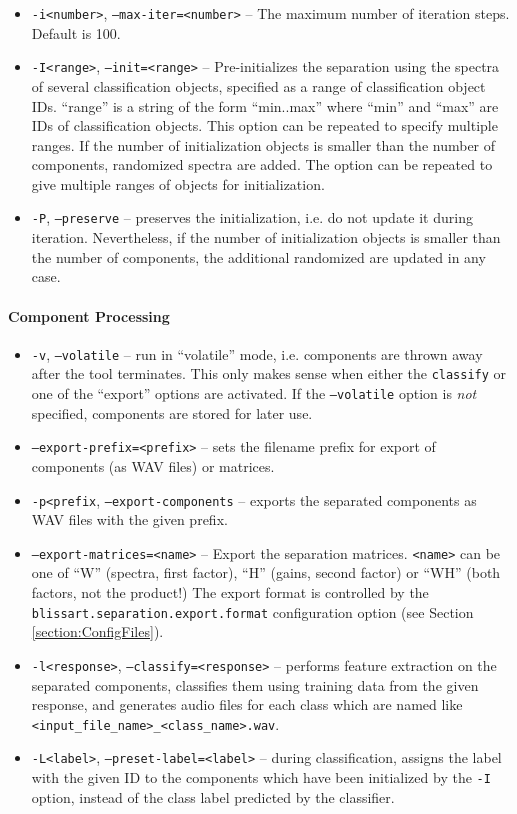 \begin{itemize}
  \item {\tt -i<number>}, {\tt --max-iter=<number>} -- The maximum number of
    iteration steps. Default is 100.
  \item {\tt -I<range>}, {\tt --init=<range>} -- Pre-initializes the
    separation using the spectra of several classification objects,
    specified as a range of classification object IDs. ``range'' is a
    string of the form ``min..max'' where ``min'' and ``max'' are IDs of
    classification objects. This option can be repeated to specify multiple
    ranges. If the number of initialization objects is smaller than the
    number of components, randomized spectra are added. The option can be 
    repeated to give multiple ranges of objects for initialization.
  \item {\tt -P}, {\tt --preserve} -- preserves the initialization, i.e. do
    not update it during iteration. Nevertheless, if the number of
    initialization objects is smaller than the number of components, the
    additional randomized are updated in any case.
\end{itemize}

\paragraph{Component Processing}
\begin{itemize}
  \item {\tt -v}, {\tt --volatile} -- run in ``volatile'' mode,
    i.e. components are thrown away after the tool terminates. This only makes
    sense when either the {\tt classify} or one of the ``export'' options are
    activated. If the {\tt --volatile} option is \emph{not}
    specified, components are stored for later use.
  \item {\tt --export-prefix=<prefix>} -- sets the filename prefix for export of
    components (as WAV files) or matrices.
  \item {\tt -p<prefix}, {\tt --export-components} -- exports the separated
    components as WAV files with the given prefix.
  \item {\tt --export-matrices=<name>} -- Export the separation matrices. 
    {\tt <name>} can be one of ``W'' (spectra, first factor), 
    ``H'' (gains, second factor) or ``WH'' (both factors, not the product!)
    The export format is controlled by the {\tt blissart.separation.export.format}
    configuration option (see Section \ref{section:ConfigFiles}).
  \item {\tt -l<response>}, {\tt --classify=<response>} -- performs feature
    extraction on the separated components, classifies them using training
    data from the given response, and generates audio files for each class
    which are named like {\tt <input\_file\_name>\_<class\_name>.wav}.
  \item {\tt -L<label>}, {\tt --preset-label=<label>} -- during classification,
    assigns the label with the given ID to the components which have been 
    initialized by the {\tt -I} option, instead of the class label predicted 
    by the classifier.
\end{itemize}



